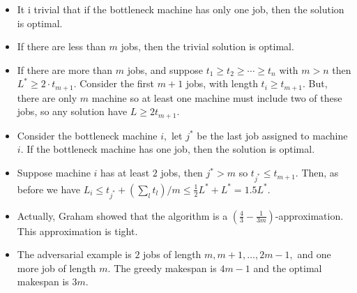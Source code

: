 \documentclass[a4paper,12pt]{article}
\begin{document}
\begin{itemize}
    \item It i trivial that if the bottleneck machine has only one job, then the solution is optimal.
    \item If there are less than $m$ jobs, then the trivial solution is optimal.
    \item If there are more than $m$ jobs, and suppose $t_1\geq t_2\geq\cdots\geq t_n$ with $m>n$ then $L^*\geq 2\cdot t_{m+1}.$ Consider the first $m+1$ jobs, with length $t_i\geq t_{m+1}.$ But, there are only $m$ machine so at least one machine must include two of these jobs, so any solution have $L\geq 2t_{m+1}.$
    \item Consider the bottleneck machine $i,$ let $j^*$ be the last job assigned to machine $i.$ If the bottleneck machine has one job, then the solution is optimal. 
    \item Suppose machine $i$ has at least $2$ jobs, then $j^*>m$ so $t_{j^*}\leq t_{m+1}.$ Then, as before we have $L_i\leq t_{j^*}+(\sum_lt_l)/m\leq \frac{1}{2}L^*+L^*=1.5L^*.$
    \item Actually, Graham showed that the algorithm is a $\left(\frac{4}{3}-\frac{1}{3m}\right)$-approximation. This approximation is tight.
    \item The adversarial example is $2$ jobs of length $m,m+1,\ldots,2m-1,$ and one more job of length $m.$ The greedy makespan is $4m-1$ and the optimal makespan is $3m.$
\end{itemize}
\end{document}
